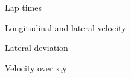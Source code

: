 \begin{figure}[ht]
    \centering
      
    \caption{Lap times}
    \label{fig:exp_lapTime}
\end{figure}

\begin{figure}[ht]
    \centering
      
    \caption{Longitudinal and lateral velocity}
    \label{fig:exp_v}
\end{figure}

\begin{figure}[ht]
    \centering
      
    \caption{Lateral deviation}
    \label{fig:exp_e_Y}
\end{figure}

\begin{figure}[ht]
    \centering
      
    \caption{Velocity over x,y}
    \label{fig:exp_v_over_xy}
\end{figure}

